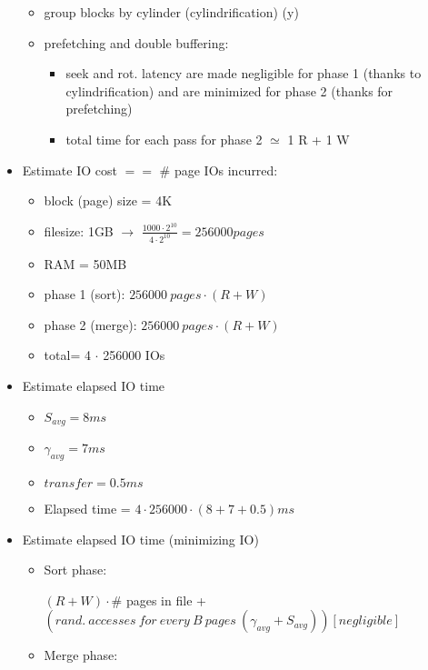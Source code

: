 \documentclass{article}
\begin{document}
\begin{itemize}
    \begin{itemize}
        \item group blocks by cylinder (cylindrification) (y)
        \item prefetching and double buffering:
            \begin{itemize}
                \item seek and rot. latency are made negligible for phase 1 (thanks to cylindrification) and are minimized for phase 2 (thanks for prefetching)
                \item total time for each pass for phase 2 $\simeq$ 1 R + 1 W
            \end{itemize}
    \end{itemize}
\item Estimate IO cost $==$ \# page IOs incurred:
    \begin{itemize}
        \item block (page) size = 4K
        \item filesize: 1GB $\rightarrow$ $\frac{1000\cdot 2^{10}}{4\cdot 2^{10}} = 256000 pages$
        \item RAM = 50MB
        \item phase 1 (sort): $256000\ pages \cdot (R+W)$
        \item phase 2 (merge): $256000\ pages \cdot (R+W)$
        \item total= 4 $\cdot$ 256000 IOs
    \end{itemize}
\item Estimate elapsed IO time
    \begin{itemize}
        \item $S_{avg} = 8ms$
        \item $\gamma_{avg} = 7ms$
        \item $transfer = 0.5ms$
        \item Elapsed time = $4\cdot 256000\cdot (8+7 +0.5)ms$
    \end{itemize}
\item Estimate elapsed IO time (minimizing IO)
    \begin{itemize}
        \item Sort phase:
            \begin{itemize}
                $(R+W)\cdot \#$ pages in file + $(rand.\ accesses\ for\ every\ B\ pages\ (\gamma_{avg} + S_{avg}))[negligible]$
            \end{itemize}
        \item Merge phase:
            \begin{itemize}

\end{itemize}
\end{itemize}
\end{itemize}
\end{document}
